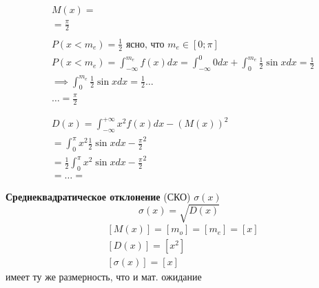 \begin{ex}
\begin{equation}
            \begin{align*}
                &M(x) = \\
                & = \frac{\pi}{2} \\
                & \\
                & P(x < m_{e}) = \frac{1}{2} \text{  ясно, что \(m_{e} \in [0; \pi]\)}\\
                & P(x < m_{e}) = \int_{-\infty}^{m_{e}} f(x)dx = \int_{-\infty}^{0} 0dx + \int_{0}^{m_{e}} \frac{1}{2}\sin xdx = \frac{1}{2}\\
                & \implies \int_{0}^{m_{e}} \frac{1}{2}\sin xdx = \frac{1}{2} \dots\\
                & \dots = \frac{\pi}{2}\\
                &\\
                &\\
                & D(x) = \int_{-\infty}^{+\infty} x^{2}f(x)dx - (M(x))^{2}\\
                & = \int_{0}^{\pi} x^{2} \frac{1}{2}\sin xdx - {\frac{\pi}{2}}^{2}\\
                & = \frac{1}{2} \int_{0}^{\pi} x^{2} \sin xdx - {\frac{\pi}{2}}^{2} \\
                & = \dots = 
            \end{align*}
        \end{equation}
    \end{ex}

    \begin{opr}
        \textbf{Среднеквадратическое отклонение} (СКО) \(\sigma(x)\)
        \begin{equation}
            \sigma(x) = \sqrt{D(x)}
        \end{equation}
        \begin{equation}
            \begin{align*}
                &[M(x)] = [m_{o}] = [m_{e}] = [x]\\
                &[D(x)] = [x^{2}]\\
                &[\sigma(x)] = [x]
            \end{align*}
        \end{equation}
        имеет ту же размерность, что и мат. ожидание 
    \end{opr}

